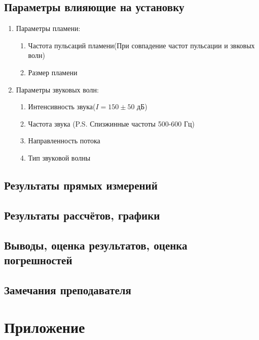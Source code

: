 \documentclass[a4paper,11pt]{article}
\begin{document}
\renewcommand{\thesubsection}{\arabic{subsection}}

\subsection{Параметры влияющие на установку}
\begin{enumerate}
    \item Параметры пламени:\begin{enumerate}
        \item Частота пульсаций пламени(При совпадение частот пульсации и звковых волн)
        \item Размер пламени
        \end{enumerate}
    \item Параметры звуковых волн:\begin{enumerate}
        \item Интенсивность звука($I = 150\pm 50$ дБ)
        \item Частота звука (P.S. Спизжинные частоты 500-600 Гц)
        \item Направленность потока 
        \item Тип звуковой волны
    \end{enumerate}
\end{enumerate}
\subsection{Результаты прямых измерений}


\subsection{Результаты рассчётов, графики}


\subsection{Выводы, оценка результатов, оценка погрешностей}


\subsection{Замечания преподавателя}

\section{Приложение}
\renewcommand{\thesubsection}{\alph{subsection}}

\noindent
\end{document}
